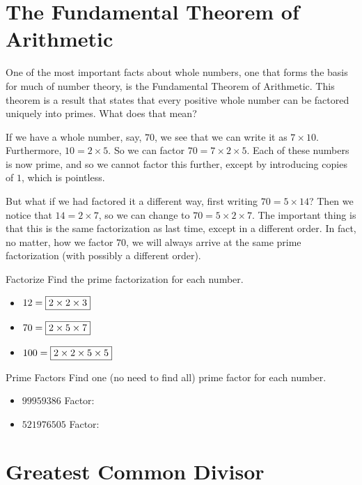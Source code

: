 \documentclass[a4paper,10pt]{report}
\begin{document}
\chapter{The Fundamental Theorem of Arithmetic}

One of the most important facts about whole numbers, one that forms the basis
for much of number theory, is the Fundamental Theorem of Arithmetic. This
theorem is a result that states that every positive whole number can be factored
uniquely into primes. What does that mean?

If we have a whole number, say, $70$, we see that we can write it as
$7\times10$. Furthermore, $10=2\times5$. So we can factor $70=7\times2\times5$.
Each of these numbers is now prime, and so we cannot factor this further, except
by introducing copies of $1$, which is pointless.

But what if we had factored it a different way, first writing $70=5\times14$?
Then we notice that $14=2\times7$, so we can change to $70=5\times2\times7$. The
important thing is that this is the same factorization as last time, except in a
different order. In fact, no matter, how we factor $70$, we will always arrive
at the same prime factorization (with possibly a different order).

\begin{problem}{Factorize}
 Find the prime factorization for each number.

 \begin{itemize}
  \item $12 = \Ans{2\times2\times3}$
  \item $70 = \Ans{2\times5\times7}$
  \item $100 = \Ans{2\times2\times5\times5}$
 \end{itemize}
\end{problem}

\begin{problem}{Prime Factors}
 Find one (no need to find all) prime factor for each number.

 \begin{itemize}
  \item $99959386$ \hfill Factor: 
  \item $521976505$ \hfill Factor: 
 \end{itemize}
\end{problem}

\chapter{Greatest Common Divisor}
\end{document}
